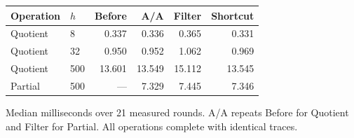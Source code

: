\begin{center}\small
\begin{tabular}{@{}llrrrr@{}}
\toprule
Operation & $h$ & Before & A/A & Filter & Shortcut \\
\midrule
Quotient & 8 & 0.337 & 0.336 & 0.365 & 0.331 \\
Quotient & 32 & 0.950 & 0.952 & 1.062 & 0.969 \\
Quotient & 500 & 13.601 & 13.549 & 15.112 & 13.545 \\
Partial & 500 & --- & 7.329 & 7.445 & 7.346 \\
\bottomrule
\end{tabular}
\end{center}
Median milliseconds over 21 measured rounds. A/A repeats Before for Quotient and Filter for Partial. All operations complete with identical traces.
